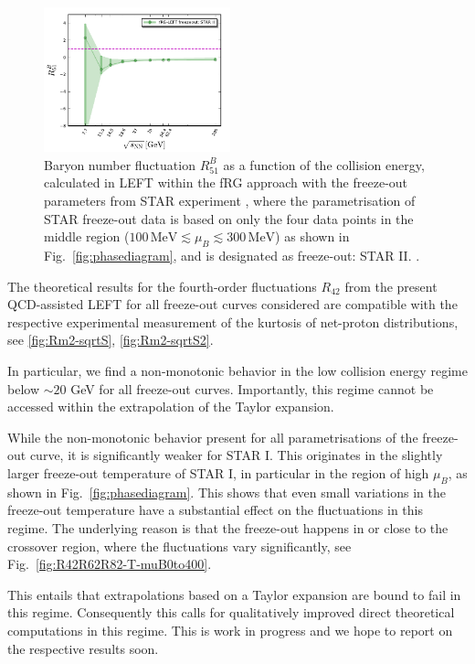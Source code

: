 \documentclass[%
reprint,
superscriptaddress,
showpacs,preprintnumbers,
amsmath,amssymb,
aps,
prd,
]{revtex4-1}
\def\Fig#1{Fig.~\ref{#1}} \def\Tab#1{Tab.~\ref{#1}}
\begin{document}
%
\begin{figure}[t]
\includegraphics[width=0.48\textwidth]{R51-sqrtS}
\caption{Baryon number fluctuation $R^{B}_{51}$ as a function of the collision energy, calculated in LEFT within the fRG approach with the freeze-out parameters from STAR experiment \cite{Adamczyk:2017iwn}, where the parametrisation of STAR freeze-out data is based on only the four data points in the middle region ($100\,\mathrm{MeV}\lesssim\mu_B\lesssim 300\,\mathrm{MeV}$) as shown in \Fig{fig:phasediagram}, and is designated as freeze-out: STAR II. .}\label{fig:R51-sqrtS}
\end{figure}
%




The theoretical results for the fourth-order fluctuations $R_{42}$ from the present QCD-assisted LEFT for all freeze-out curves considered are compatible with the respective experimental measurement of the kurtosis of net-proton distributions, see \autoref{fig:Rm2-sqrtS}, \autoref{fig:Rm2-sqrtS2}. 

In particular, we find a non-monotonic behavior in the low collision energy regime below $\sim 20$ GeV for all freeze-out curves. Importantly, this regime cannot be accessed within the extrapolation of the Taylor expansion. 

While the non-monotonic behavior present for all parametrisations of the freeze-out curve, it is significantly weaker for STAR I. This originates in the slightly larger freeze-out temperature of STAR I, in particular in the region of high $\mu_B$, as shown in \Fig{fig:phasediagram}. This shows that even small variations in the freeze-out temperature have a substantial effect on the fluctuations in this regime. The underlying reason is that the freeze-out happens in or close to the crossover region, where the fluctuations vary significantly, see \Fig{fig:R42R62R82-T-muB0to400}. 

This entails that extrapolations based on a Taylor expansion are bound to fail in this regime. Consequently this calls for qualitatively improved direct theoretical computations in this regime. This is work in progress and we hope to report on the respective results soon. 
\end{document}
